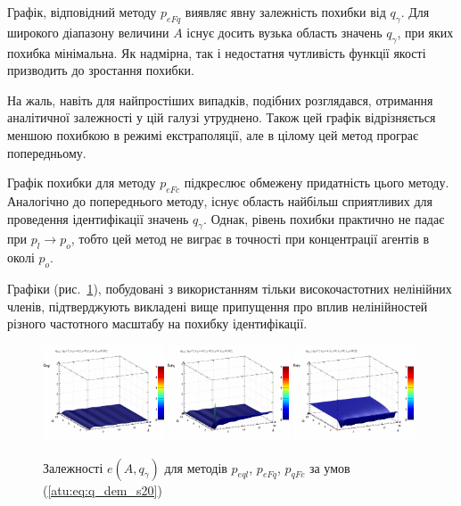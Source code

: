 Графік, відповідний методу $p_{eFq}$ виявляє явну залежність похибки від
$q_\gamma$. Для широкого діапазону величини $ A $ існує досить вузька область
значень $q_\gamma$, при яких похибка мінімальна. Як надмірна, так і
недостатня чутливість функції якості призводить до зростання похибки.

На жаль, навіть для найпростіших випадків, подібних розглядався,
отримання аналітичної залежності у цій галузі утруднено. Також
цей графік відрізняється меншою похибкою в режимі
екстраполяції, але в цілому цей метод програє попередньому.

Графік похибки для методу $p_{eFc}$ підкреслює обмежену придатність цього методу.
Аналогічно до попереднього методу, існує область найбільш
сприятливих для проведення ідентифікації значень
$ q_\gamma $. Однак, рівень похибки практично не падає при
$ p_l \to p_o $, тобто цей метод не виграє в точності при концентрації
агентів в околі
$ p_o $.

Графіки (рис.~\ref{atu:f:qsl_pe_A_qg_s20}), побудовані з використанням тільки
високочастотних нелінійних членів, підтверджують викладені
вище припущення про вплив нелінійностей різного частотного
масштабу на похибку ідентифікації.

\begin{figure}[htb!]
  \begin{center}
    \includegraphics[width=0.32\textwidth]{p/qls_pe-p_A_qg_eql_s20.png}
    \hfill
    \includegraphics[width=0.32\textwidth]{p/qls_pe-p_A_qg_eFq_s20.png}
    \hfill
    \includegraphics[width=0.32\textwidth]{p/qls_pe-p_A_qg_eFc_s20.png}
  \end{center}
  \caption{Залежності $e(A,q_\gamma)$ для методів $p_{eql}$, $p_{eFq}$, $p_{qFc}$ за умов (\ref{atu:eq:q_dem_s20})}
  \label{atu:f:qsl_pe_A_qg_s20}
\end{figure}


